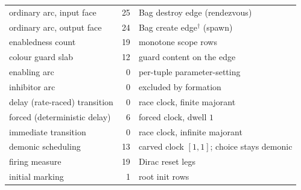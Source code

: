 {\begin{minipage}[t]{0.57\textwidth}
\begin{center}
\begin{tabular}{@{}lrl@{}}
\midrule
ordinary arc, input face & 25 & Bag destroy edge (rendezvous)\\
ordinary arc, output face & 24 & Bag create edge$^{\dagger}$ (spawn)\\
enabledness count & 19 & monotone scope rows\\
colour guard slab & 12 & guard content on the edge\\
enabling arc & 0 & per-tuple parameter-setting\\
inhibitor arc & 0 & excluded by formation\\
delay (rate-raced) transition & 0 & race clock, finite majorant\\
forced (deterministic delay) & 6 & forced clock, dwell $1$\\
immediate transition & 0 & race clock, infinite majorant\\
demonic scheduling & 13 & carved clock $[1,1]$; choice stays demonic\\
firing measure & 19 & Dirac reset legs\\
initial marking & 1 & root init rows\\
\bottomrule
\end{tabular}
\end{center}
\end{minipage}

\smallskip

}

